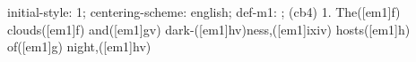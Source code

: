 initial-style: 1;
centering-scheme: english;
def-m1: \grealign;
(cb4) 1. The([em1]f) clouds([em1]f) and([em1]gv) dark-([em1]hv)ness,([em1]ixiv) hosts([em1]h) of([em1]g) night,([em1]hv)